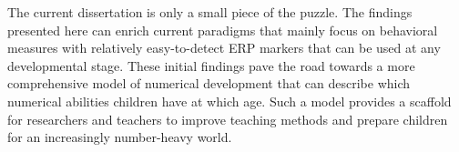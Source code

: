 \begin{refsection}
The current dissertation is only a small piece of the puzzle. The findings presented here can enrich current paradigms that mainly focus on behavioral measures with relatively easy-to-detect ERP markers that can be used at any developmental stage. These initial findings pave the road towards a more comprehensive model of numerical development that can describe which numerical abilities children have at which age. Such a model provides a scaffold for researchers and teachers to improve teaching methods and prepare children for an increasingly number-heavy world.

\end{refsection}
\RemoveLabels
